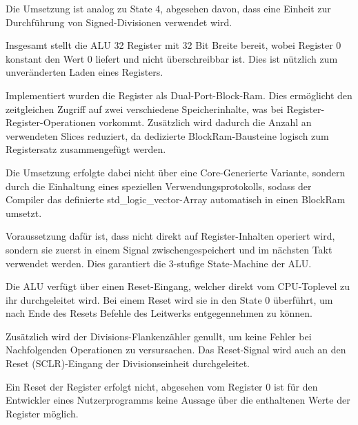 Die Umsetzung ist analog zu State 4, abgesehen davon, dass eine Einheit zur Durchf\"uhrung von Signed-Divisionen verwendet wird.

Insgesamt stellt die ALU 32 Register mit 32 Bit Breite bereit, wobei Register 0 konstant den Wert 0 liefert und nicht \"uberschreibbar ist. Dies ist n\"utzlich zum unveränderten Laden eines Registers.

Implementiert wurden die Register als Dual-Port-Block-Ram. Dies erm\"oglicht den zeitgleichen Zugriff auf zwei verschiedene Speicherinhalte, was bei Register-Register-Operationen vorkommt. Zusätzlich wird dadurch die Anzahl an verwendeten Slices reduziert, da dedizierte BlockRam-Bausteine logisch zum Registersatz zusammengef\"ugt werden.\vspace{10}

Die Umsetzung erfolgte dabei nicht \"uber eine Core-Generierte Variante, sondern durch die Einhaltung eines speziellen Verwendungsprotokolls, sodass der Compiler das definierte std_logic_vector-Array automatisch in einen BlockRam umsetzt.

Voraussetzung daf\"ur ist, dass nicht direkt auf Register-Inhalten operiert wird, sondern sie zuerst in einem Signal zwischengespeichert und im nächsten Takt verwendet werden. Dies garantiert die 3-stufige State-Machine der ALU.

Die ALU verf\"ugt \"uber einen Reset-Eingang, welcher direkt vom CPU-Toplevel zu ihr durchgeleitet wird. Bei einem Reset wird sie in den State 0 \"uberf\"uhrt, um nach Ende des Resets Befehle des Leitwerks entgegennehmen zu k\"onnen.

Zusätzlich wird der Divisions-Flankenzähler genullt, um keine Fehler bei Nachfolgenden Operationen zu versursachen. Das Reset-Signal wird auch an den Reset (SCLR)-Eingang der Divisionseinheit durchgeleitet.

Ein Reset der Register erfolgt nicht, abgesehen vom Register 0 ist f\"ur den Entwickler eines Nutzerprogramms keine Aussage \"uber die enthaltenen Werte der Register m\"oglich.

